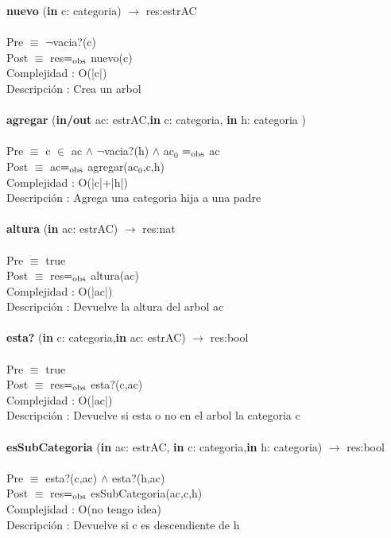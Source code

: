 \documentclass[10pt, a4paper]{article}
\begin{document}
	\textbf{nuevo} (\textbf{in} c: categoria) $\longrightarrow$ res:estrAC\\\\
	Pre $\equiv$ {$¬$vacia?(c)}\\
	Post $\equiv$ {res$=_{\mathrm{obs}}$ nuevo(c)}\\
	Complejidad : O(|c|)\\
	Descripci\'{o}n : Crea un arbol\\\\	
	
	\textbf{agregar} (\textbf{in/out} ac: estrAC,\textbf{in} c: categoria, \textbf{in} h: categoria )\\\\
	Pre $\equiv$ {c $\in$ ac $\wedge$ $¬$vacia?(h) $\wedge$ ac${_0}$ $=_{\mathrm{obs}}$ ac}\\
	Post $\equiv$ {ac$=_{\mathrm{obs}}$ agregar(ac${_0}$,c,h)}\\
	Complejidad : O(|c|+|h|)\\
	Descripci\'{o}n : Agrega una categoria hija a una padre\\\\
	
	\textbf{altura} (\textbf{in} ac: estrAC) $\longrightarrow$ res:nat\\\\
	Pre $\equiv$ {true}\\
	Post $\equiv$ {res$=_{\mathrm{obs}}$ altura(ac)}\\
	Complejidad : O(|ac|)\\
	Descripci\'{o}n : Devuelve la altura del arbol ac\\\\	
	
	\textbf{esta?} (\textbf{in} c: categoria,\textbf{in} ac: estrAC) $\longrightarrow$ res:bool\\\\
	Pre $\equiv$ {true}\\
	Post $\equiv$ {res$=_{\mathrm{obs}}$ esta?(c,ac)}\\
	Complejidad : O(|ac|)\\
	Descripci\'{o}n : Devuelve si esta o no en el arbol la categoria c\\\\	
	
	\textbf{esSubCategoria} (\textbf{in} ac: estrAC, \textbf{in} c: categoria,\textbf{in} h: categoria) $\longrightarrow$ res:bool\\\\
	Pre $\equiv$ {esta?(c,ac) $\wedge$ esta?(h,ac)}\\
	Post $\equiv$ {res$=_{\mathrm{obs}}$ esSubCategoria(ac,c,h)}\\
	Complejidad : O(no tengo idea)\\
	Descripci\'{o}n : Devuelve si c es descendiente de h\\\\	
	
\end{document}
